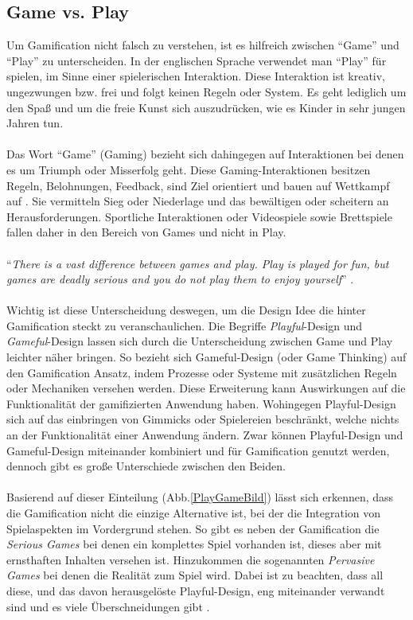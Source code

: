 \documentclass[a4paper,12pt,twoside]{scrartcl}
\begin{document}
\subsection{Game vs. Play}
Um Gamification nicht falsch zu verstehen, ist es hilfreich zwischen \enquote{Game} und \enquote{Play} zu unterscheiden. In der englischen Sprache verwendet man \enquote{Play} für spielen, im Sinne einer spielerischen Interaktion. Diese Interaktion ist kreativ, ungezwungen bzw. frei und folgt keinen Regeln oder System. Es geht lediglich um den Spaß und um die freie Kunst sich auszudrücken, wie es Kinder in sehr jungen Jahren tun.
\\\\
Das Wort \enquote{Game} (Gaming) bezieht sich dahingegen auf Interaktionen bei denen es um Triumph oder Misserfolg geht. Diese Gaming-Interaktionen besitzen Regeln, Belohnungen, Feedback, sind Ziel orientiert und bauen auf Wettkampf auf \cite{Deterding2011}. Sie vermitteln Sieg oder Niederlage und das bewältigen oder scheitern an Herausforderungen. Sportliche Interaktionen oder Videospiele sowie Brettspiele fallen daher in den Bereich von Games und nicht in Play. 
\\\\
\enquote{\textit{There is a vast difference between games and play. Play is played for fun, but games are deadly serious and you do not play them to enjoy yourself}} \cite{Baring2014}.
\\\\
Wichtig ist diese Unterscheidung deswegen, um die Design Idee die hinter Gamification steckt zu veranschaulichen. Die Begriffe \textit{Playful}-Design und \textit{Gameful}-Design lassen sich durch die Unterscheidung zwischen Game und Play leichter näher bringen. So bezieht sich Gameful-Design (oder Game Thinking) auf den Gamification Ansatz, indem Prozesse oder Systeme mit zusätzlichen Regeln oder Mechaniken versehen werden. Diese Erweiterung kann Auswirkungen auf die Funktionalität der gamifizierten Anwendung haben. Wohingegen Playful-Design sich auf das einbringen von Gimmicks oder Spielereien beschränkt, welche nichts an der Funktionalität einer Anwendung ändern. Zwar können Playful-Design und Gameful-Design miteinander kombiniert und für Gamification genutzt werden, dennoch gibt es große Unterschiede zwischen den Beiden.
\\\\
Basierend auf dieser Einteilung (Abb.\ref{PlayGameBild}) lässt sich erkennen, dass die Gamification nicht die einzige Alternative ist, bei der die Integration von Spielaspekten im Vordergrund stehen. So gibt es neben der Gamification die \textit{Serious Games} bei denen ein komplettes Spiel vorhanden ist, dieses aber mit ernsthaften Inhalten versehen ist. Hinzukommen die sogenannten \textit{Pervasive Games} bei denen die Realität zum Spiel wird. Dabei ist zu beachten, dass all diese, und das davon herausgelöste Playful-Design, eng miteinander verwandt sind und es viele Überschneidungen gibt \cite{Deterding2011}.
\end{document}
